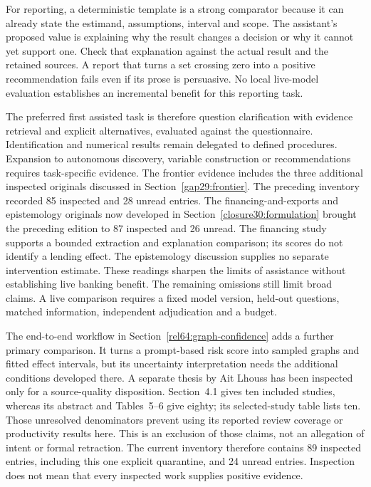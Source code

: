 For reporting, a deterministic template is a strong comparator because
it can already state the estimand, assumptions, interval and scope.
The assistant's proposed value is explaining why the result changes a
decision or why it cannot yet support one. Check that explanation
against the actual result and the retained sources. A report that turns
a set crossing zero into a positive recommendation fails even if its
prose is persuasive. No local live-model evaluation establishes an
incremental benefit for this reporting task.

The preferred first assisted task is therefore question clarification
with evidence retrieval and explicit alternatives, evaluated against
the questionnaire. Identification and numerical results remain delegated
to defined procedures. Expansion to autonomous discovery, variable
construction or recommendations requires task-specific evidence. The
frontier evidence includes the three additional inspected originals discussed
in Section~\ref{gap29:frontier}. The preceding inventory recorded 85 inspected
and 28 unread entries. The financing-and-exports and epistemology originals
now developed in Section~\ref{closure30:formulation} brought the preceding edition to
87 inspected and 26 unread. The financing study supports a bounded extraction
and explanation comparison; its scores do not identify a lending effect.
The epistemology discussion supplies no separate intervention estimate. These
readings sharpen the limits of assistance without establishing live banking
benefit. The remaining omissions still limit broad claims. A live comparison
requires a fixed model version, held-out questions, matched information,
independent adjudication and a budget.~\citep{rel18li,rel18mugleston}

The end-to-end workflow in Section~\ref{rel64:graph-confidence} adds a
further primary comparison. It turns a prompt-based risk score into sampled
graphs and fitted effect intervals, but its uncertainty interpretation needs
the additional conditions developed there. A separate thesis by Ait Lhouss
has been inspected only for a source-quality disposition. Section~4.1 gives
ten included studies, whereas its abstract and Tables~5--6 give eighty; its
selected-study table lists ten. Those unresolved denominators prevent using
its reported review coverage or productivity results here. This is an
exclusion of those claims, not an allegation of intent or formal retraction.
The current inventory therefore contains 89 inspected entries, including
this one explicit quarantine, and 24 unread entries. Inspection does not
mean that every inspected work supplies positive evidence. \citep{rel64molero,rel64aitlhouss}



